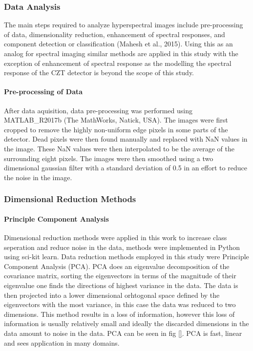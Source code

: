 \documentclass[11pt]{article}
\begin{document}
    \hypertarget{data-analysis}{%
\subsubsection{Data Analysis}\label{data-analysis}}

    The main steps required to analyze hyperspectral images include
pre-processing of data, dimensionality reduction, enhancement of
spectral responses, and component detection or classification (Mahesh et
al., 2015). Using this as an analog for spectral imaging similar methods
are applied in this study with the exception of enhancement of spectral
response as the modelling the spectral response of the CZT detector is
beyond the scope of this study.

    \hypertarget{pre-processing-of-data}{%
\paragraph{Pre-processing of Data}\label{pre-processing-of-data}}

    After data aquisition, data pre-processing was performed using
MATLAB\_R2017b (The MathWorks, Natick, USA). The images were first
cropped to remove the highly non-uniform edge pixels in some parts of
the detector. Dead pixels were then found manually and replaced with NaN
values in the image. These NaN values were then interpolated to be the
average of the surrounding eight pixels. The images were then smoothed
using a two dimensional gaussian filter with a standard deviation of 0.5
in an effort to reduce the noise in the image.

    \hypertarget{dimensional-reduction-methods}{%
\subsubsection{Dimensional Reduction
Methods}\label{dimensional-reduction-methods}}

    \hypertarget{principle-component-analysis}{%
\paragraph{Principle Component
Analysis}\label{principle-component-analysis}}

    Dimensional reduction methods were applied in this work to increase
class seperation and reduce noise in the data, methods were implemented
in Python using sci-kit learn. Data reduction methods employed in this
study were Principle Component Analysis (PCA). PCA does an eigenvalue
decomposition of the covariance matrix, sorting the eigenvectors in
terms of the magnitude of their eigenvalue one finds the directions of
highest variance in the data. The data is then projected into a lower
dimensional orhtogonal space defined by the eigenvectors with the most
variance, in this case the data was reduced to two dimensions. This
method results in a loss of information, however this loss of
information is usually relatively small and ideally the discarded
dimensions in the data amount to noise in the data. PCA can be seen in
fig \ref{}. PCA is fast, linear and sees application in many domains.
\end{document}

